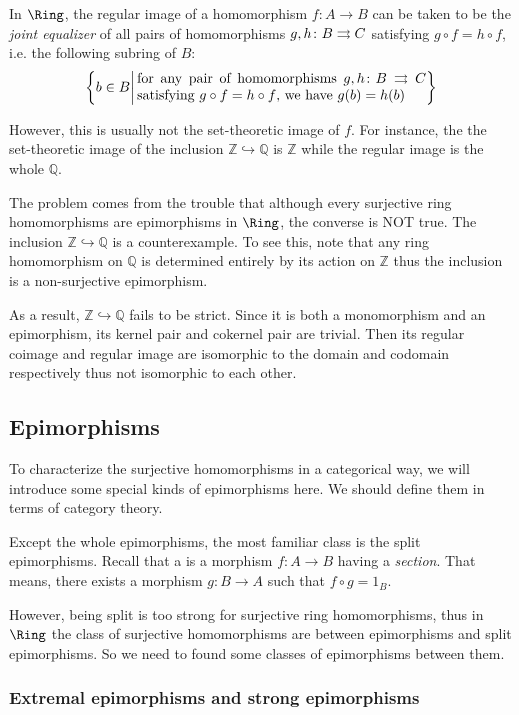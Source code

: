   In $\Ring$, the regular image of a homomorphism $f\colon A\to B$ can be taken to be the \emph{joint equalizer} of all pairs of homomorphisms $g,h\colon B\rightrightarrows C$ satisfying $g\circ f=h\circ f$, i.e. the following subring of $B$:
  \begin{equation*}
    \left\{b\in B \middle|\, \parbox{0.6\textwidth}{for any pair of homomorphisms $g,h\colon B\tto C$ satisfying $g\circ f=h\circ f$, we have $g(b)=h(b)$} \right\}
  \end{equation*}

  However, this is usually not the set-theoretic image of $f$. For instance, the the set-theoretic image of the inclusion $\mathbb{Z}\hookrightarrow\mathbb{Q}$ is $\mathbb{Z}$ while the regular image is the whole $\mathbb{Q}$.

  The problem comes from the trouble that although every surjective ring homomorphisms are epimorphisms in $\Ring$, the converse is NOT true. The inclusion $\mathbb{Z}\hookrightarrow\mathbb{Q}$ is a counterexample. To see this, note that any ring homomorphism on $\mathbb{Q}$ is determined entirely by its action on $\mathbb{Z}$ thus the inclusion is a non-surjective epimorphism.

  As a result, $\mathbb{Z}\hookrightarrow\mathbb{Q}$ fails to be strict. Since it is both a monomorphism and an epimorphism, its kernel pair and cokernel pair are trivial. Then its regular coimage and regular image are isomorphic to the domain and codomain respectively thus not isomorphic to each other.


\subsection{Epimorphisms}
  To characterize the surjective homomorphisms in a categorical way, we will introduce some special kinds of epimorphisms here. We should define them in terms of category theory.

  Except the whole epimorphisms, the most familiar class is the split epimorphisms. Recall that a  is a morphism $f\colon A\to B$ having a \emph{section}. That means, there exists a morphism $g\colon B\to A$ such that $f\circ g = 1_B$.

  However, being split is too strong for surjective ring homomorphisms, thus in $\Ring$ the class of surjective homomorphisms are between epimorphisms and split epimorphisms. So we need to found some classes of epimorphisms between them.

\subsubsection{Extremal epimorphisms and strong epimorphisms}

